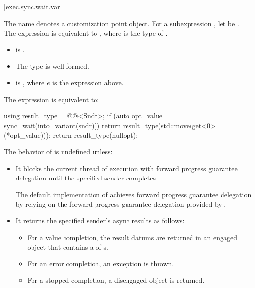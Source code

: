 [exec.sync.wait.var]{}

\pnum
The name  denotes
a customization point object.
For a subexpression ,
let  be .
The expression 
is equivalent to ,
where  is the type of
.

\pnum
\mandates
\begin{itemize}
\item
{} is .
\item
The type 
is well-formed.
\item
{}
is , where $e$ is the  expression above.
\end{itemize}

\pnum
The expression  is equivalent to:
\begin{codeblock}
using result_type = @@<Sndr>;
if (auto opt_value = sync_wait(into_variant(sndr))) {
  return result_type(std::move(get<0>(*opt_value)));
}
return result_type(nullopt);
\end{codeblock}

\pnum
The behavior of 
is undefined unless:
\begin{itemize}
\item
It blocks the current thread of execution
with forward progress guarantee delegation
until the specified sender completes.
\begin{note}
The default implementation of  achieves
forward progress guarantee delegation by relying on
the forward progress guarantee delegation provided by .
\end{note}
\item
It returns the specified sender's async results as follows:
\begin{itemize}
\item
For a value completion,
the result datums are returned in an engaged  object
that contains a  of s.
\item
For an error completion, an exception is thrown.
\item
For a stopped completion, a disengaged  object is returned.
\end{itemize}
\end{itemize}

